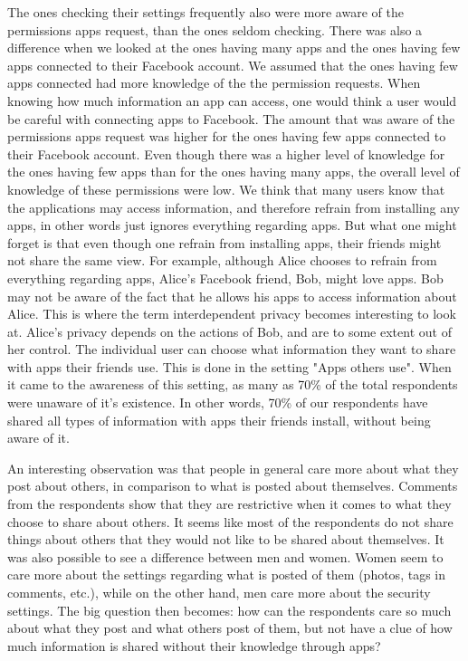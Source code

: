 The ones checking their settings frequently also were more aware of the permissions apps request, than the ones seldom checking. There was also a difference when we looked at the ones having many apps and the ones having few apps connected to their Facebook account. We assumed that the ones having few apps connected had more knowledge of the the permission requests. When knowing how much information an app can access, one would think a user would be careful with connecting apps to Facebook. The amount that was aware of the permissions apps request was higher for the ones having few apps connected to their Facebook account. Even though there was a higher level of knowledge for the ones having few apps than for the ones having many apps, the overall level of knowledge of these permissions were low. We think that many users know that the applications may access information, and therefore refrain from installing any apps, in other words just ignores everything regarding apps. But what one might forget is that even though one refrain from installing apps, their friends might not share the same view. For example, although Alice chooses to refrain from everything regarding apps, Alice's Facebook friend, Bob, might love apps. Bob may not be aware of the fact that he allows his apps to access information about Alice. This is where the term interdependent privacy becomes interesting to look at. Alice's privacy depends on the actions of Bob, and are to some extent out of her control. The individual user can choose what information they want to share with apps their friends use. This is done in the setting "Apps others use". When it came to the awareness of this setting, as many as 70\% of the total respondents were unaware of it's existence. In other words, 70\% of our respondents have shared all types of information with apps their friends install, without being aware of it.

An interesting observation was that people in general care more about what they post about others, in comparison to what is posted about themselves. Comments from the respondents show that they are restrictive when it comes to what they choose to share about others. It seems like most of the respondents do not share things about others that they would not like to be shared about themselves. It was also possible to see a difference between men and women. Women seem to care more about the settings regarding what is posted of them (photos, tags in comments, etc.), while on the other hand, men care more about the security settings. The big question then becomes: how can the respondents care so much about what they post and what others post of them, but not have a clue of how much information is shared without their knowledge through apps? 

